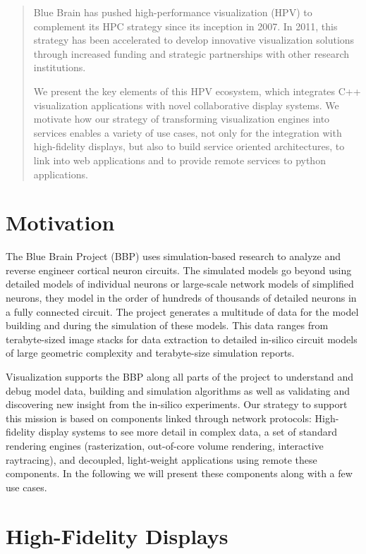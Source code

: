 \documentclass[10pt]{llncs}
\begin{document}
\begin{abstract}
  Blue Brain has pushed high-performance visualization (HPV) to complement its
  HPC strategy since its inception in 2007. In 2011, this strategy has been
  accelerated to develop innovative visualization solutions through increased
  funding and strategic partnerships with other research institutions.

  We present the key elements of this HPV ecosystem, which integrates C++
  visualization applications with novel collaborative display systems. We
  motivate how our strategy of transforming visualization engines into services
  enables a variety of use cases, not only for the integration with
  high-fidelity displays, but also to build service oriented architectures, to
  link into web applications and to provide remote services to python
  applications.
\end{abstract}

\section{Motivation}

The Blue Brain Project (BBP) uses simulation-based research to analyze and
reverse engineer cortical neuron circuits. The simulated models go beyond using
detailed models of individual neurons or large-scale network models of
simplified neurons, they model in the order of hundreds of thousands of detailed
neurons in a fully connected circuit. The project generates a multitude of data
for the model building and during the simulation of these models. This data
ranges from terabyte-sized image stacks for data extraction to detailed
in-silico circuit models of large geometric complexity and terabyte-size
simulation reports.

Visualization supports the BBP along all parts of the project to understand and
debug model data, building and simulation algorithms as well as validating and
discovering new insight from the in-silico experiments. Our strategy to support
this mission is based on components linked through network protocols:
High-fidelity display systems to see more detail in complex data, a set of
standard rendering engines (rasterization, out-of-core volume rendering,
interactive raytracing), and decoupled, light-weight applications using remote
these components. In the following we will present these components along with a
few use cases.


\section{High-Fidelity Displays}
\end{document}
